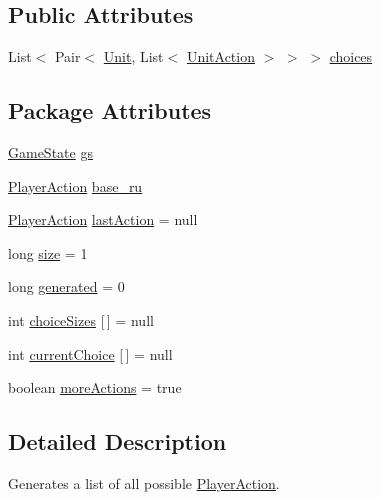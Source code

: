 \subsection*{Public Attributes}
\begin{DoxyCompactItemize}
\item 
List$<$ Pair$<$ \hyperlink{classrts_1_1units_1_1_unit}{Unit}, List$<$ \hyperlink{classrts_1_1units_1_1_unit_action}{UnitAction} $>$ $>$ $>$ \hyperlink{classai_1_1util_1_1_player_action_generator_aeea7fa8dec447b99c43c404ae8dbc9c6}{choices}
\end{DoxyCompactItemize}
\subsection*{Package Attributes}
\begin{DoxyCompactItemize}
\item 
\hyperlink{classrts_1_1_game_state}{GameState} \hyperlink{classai_1_1util_1_1_player_action_generator_a44fe40be01594178101a1c995be1594f}{gs}
\item 
\hyperlink{classai_1_1util_1_1_player_action}{PlayerAction} \hyperlink{classai_1_1util_1_1_player_action_generator_a42eb1a174f5a0348eaf3e7c69a17a32c}{base\_\-ru}
\item 
\hyperlink{classai_1_1util_1_1_player_action}{PlayerAction} \hyperlink{classai_1_1util_1_1_player_action_generator_af69ec3d55fc4ae7b8db797eaff970178}{lastAction} = null
\item 
long \hyperlink{classai_1_1util_1_1_player_action_generator_a8c779395b3ffdf164c9a85cb1032347a}{size} = 1
\item 
long \hyperlink{classai_1_1util_1_1_player_action_generator_a07c34e98f690fd013026f7d4f50de7e9}{generated} = 0
\item 
int \hyperlink{classai_1_1util_1_1_player_action_generator_a5bb3a20eebe61f34068dcf7e80ec81cc}{choiceSizes} \mbox{[}$\,$\mbox{]} = null
\item 
int \hyperlink{classai_1_1util_1_1_player_action_generator_a6942eafe123c2bea65a5e8e96c7337d5}{currentChoice} \mbox{[}$\,$\mbox{]} = null
\item 
boolean \hyperlink{classai_1_1util_1_1_player_action_generator_a8ca52e8a0afa80cd5df24a68fec7e13d}{moreActions} = true
\end{DoxyCompactItemize}


\subsection{Detailed Description}
Generates a list of all possible \hyperlink{classai_1_1util_1_1_player_action}{PlayerAction}. 


